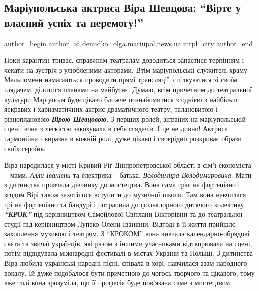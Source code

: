  
 
 
 
 
 
\subsection{Маріупольська актриса Віра Шевцова: \enquote{Вірте у власний успіх та перемогу!}}
\label{sec:29_04_2020.stz.news.ua.mrpl_city.1.vira_shevcova}
 
\ifcmt
 author_begin
   author_id demidko_olga.mariupol,news.ua.mrpl_city
 author_end
\fi

Поки карантин триває, справжнім театралам доводиться запастися терпінням і
чекати на зустріч з улюбленими акторами. Втім маріупольські служителі храму
Мельпомени намагаються проводити прямі трансляції, спілкуватися зі своїм
глядачем, ділитися планами на майбутнє. Думаю, всім причетним до театральної
культури Маріуполя буде цікаво ближче познайомитися з однією з найбільш
яскравих і харизматичних актрис драматичного театру, талановитою і
різноплановою \emph{\textbf{Вірою Шевцовою}}. З перших ролей, зіграних на маріупольській сцені,
вона з легкістю закохувала в себе глядачів. І це не дивно! Актриса гармонійна і
виразна в кожній ролі, дуже цікаво і своєрідно розкриває образи своїх героїнь.


Віра народилася у місті Кривий Ріг Дніпропетровської області в сім'ї економіста
– мами, \emph{Алли Іванівни} та електрика – батька, \emph{Володимира Володимировича}. Мати з
дитинства привчала дівчинку до мистецтва. Вона сама грає на фортепіано і згодом
Вірі також захотілося вступити до музичної школи. Там вона навчилася грі на
фортепіано та бандурі і потрапила до фольклорного дитячого колективу \emph{\textbf{\enquote{КРОК}}} під
керівництвом Самойлової Світлани Вікторівни та до театральної студії під
керівництвом Лупеко Олени Іванівни. Відтоді в її життя прийшло захоплення
музикою і театром. З \enquote{КРОКОМ} вона вивчала календарно-обрядові свята та звичаї
українців, які разом з іншими учасниками відтворювала на сцені, потім
відвідувала міжнародні фестивалі в містах України та Польщі. З дитинства Віра
любила українські народні пісні, співала в хорі, навчилася азам народного
вокалу. Їй дуже подобалося бути причетною до чогось творчого та цікавого, тому
вже тоді вона зрозуміла, що її професія буде пов'язана саме з мистецтвом.

